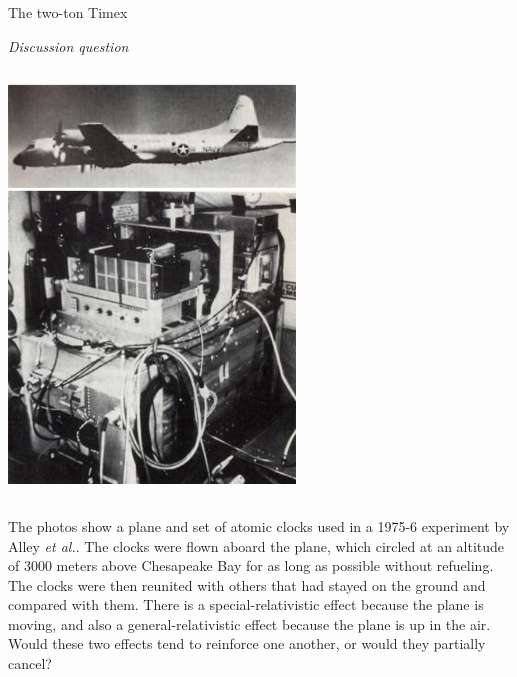 \begin{frame}{The two-ton Timex}

\emph{Discussion question}

  \begin{mycolumns}

    \begin{column}{.3\textwidth}\includegraphics[width=3in]{ch09/figs/alley-plane-and-clock.jpg}\end{column}

    \begin{column}{.7\textwidth}

      The photos show a plane and set of atomic clocks used in a 1975-6 experiment by Alley \emph{et al.}.
      The clocks were flown aboard the plane, which
      circled at an altitude of 3000 meters above Chesapeake Bay for as long as possible without refueling.
      The clocks were then reunited with others that had stayed on the ground and compared with them.
      There is a special-relativistic effect because the plane is moving, and also a general-relativistic effect
      because the plane is up in the air. Would these two effects tend to reinforce one another, or would they
      partially cancel?

    \end{column}
  \end{mycolumns}


\end{frame}

